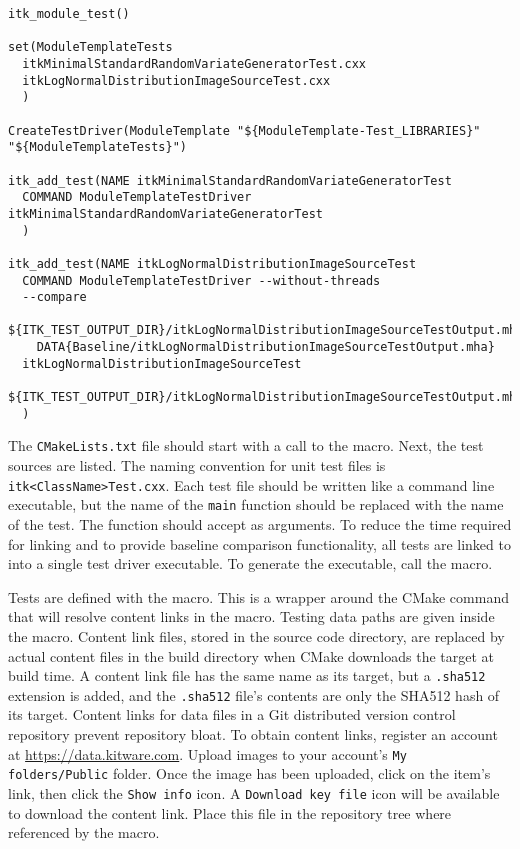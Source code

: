 \begin{verbatim}
itk_module_test()

set(ModuleTemplateTests
  itkMinimalStandardRandomVariateGeneratorTest.cxx
  itkLogNormalDistributionImageSourceTest.cxx
  )

CreateTestDriver(ModuleTemplate "${ModuleTemplate-Test_LIBRARIES}" "${ModuleTemplateTests}")

itk_add_test(NAME itkMinimalStandardRandomVariateGeneratorTest
  COMMAND ModuleTemplateTestDriver itkMinimalStandardRandomVariateGeneratorTest
  )

itk_add_test(NAME itkLogNormalDistributionImageSourceTest
  COMMAND ModuleTemplateTestDriver --without-threads
  --compare
    ${ITK_TEST_OUTPUT_DIR}/itkLogNormalDistributionImageSourceTestOutput.mha
    DATA{Baseline/itkLogNormalDistributionImageSourceTestOutput.mha}
  itkLogNormalDistributionImageSourceTest
    ${ITK_TEST_OUTPUT_DIR}/itkLogNormalDistributionImageSourceTestOutput.mha
  )
\end{verbatim}

The \texttt{CMakeLists.txt} file should start with a call to the
 macro. Next, the test sources are listed. The naming
convention for unit test files is \texttt{itk<ClassName>Test.cxx}. Each test
file should be written like a command line executable, but the name of the
\texttt{main} function should be replaced with the name of the test. The
function should accept  as arguments. To reduce
the time required for linking and to provide baseline comparison functionality,
all tests are linked to into a single test driver executable. To generate the
executable, call the  macro.

Tests are defined with the  macro. This is a wrapper
around the CMake  command that will resolve content links in
the  macro. Testing data paths are given inside the 
macro. Content link files, stored in the source code directory, are replaced
by actual content files in the build directory when CMake downloads the
 target at build time. A content link file has the same name as
its target, but a \texttt{.sha512} extension is added, and the \texttt{.sha512}
file's contents are only the SHA512 hash of its target. Content links for data
files in a Git distributed version control repository prevent repository
bloat. To obtain content links, register an account at
\url{https://data.kitware.com}. Upload images to your account's
\texttt{My folders/Public} folder. Once the image has been uploaded, click on the
item's link, then click the \texttt{Show info} icon. A \texttt{Download key
file} icon will be available to download the content link. Place this file in
the repository tree where referenced by the  macro.

